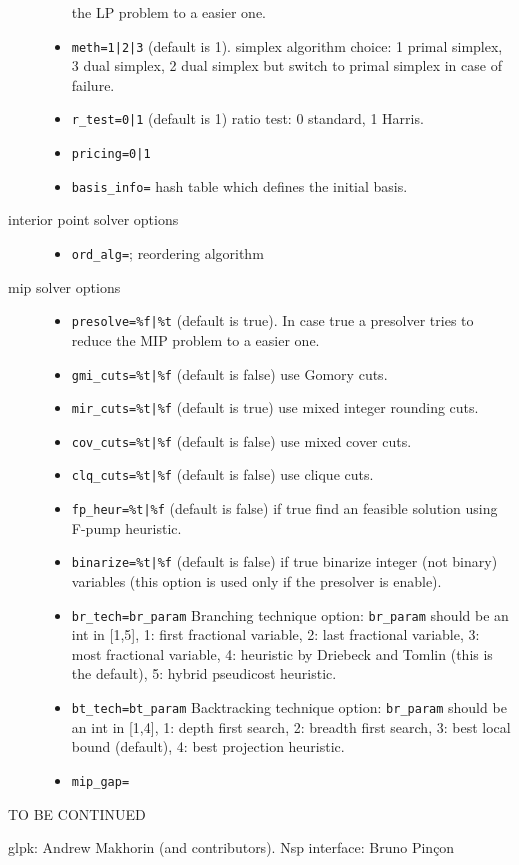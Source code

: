 \begin{mandescription}
\begin{description}
\begin{itemize}
      the LP problem to a easier one.
\item \verb+meth=1|2|3+ (default is 1). simplex algorithm choice: 1 primal simplex, 3 dual simplex, 2 
      dual simplex but switch to primal simplex in case of failure.
\item \verb+r_test=0|1+ (default is 1) ratio test: 0 standard, 1 Harris.
\item \verb+pricing=0|1+
\item \verb+basis_info=+  hash table which defines the initial basis.
\end{itemize}
\item[interior point solver options]
\begin{itemize}
\item \verb+ord_alg=+; reordering algorithm
\end{itemize}
\item[mip solver options]
\begin{itemize}
\item \verb+presolve=%f|%t+ (default is true). In case true a presolver tries to reduce
      the MIP problem to a easier one.
\item \verb+gmi_cuts=%t|%f+ (default is false) use Gomory cuts.
\item \verb+mir_cuts=%t|%f+ (default is true) use mixed integer rounding cuts.
\item \verb+cov_cuts=%t|%f+ (default is false) use mixed cover cuts.
\item \verb+clq_cuts=%t|%f+ (default is false) use clique cuts.
\item \verb+fp_heur=%t|%f+ (default is false) if true find an feasible solution using F-pump heuristic.
\item \verb+binarize=%t|%f+ (default is false) if true binarize integer (not binary) variables (this 
      option is used only if the presolver is enable).
\item \verb+br_tech=br_param+ Branching technique option: \verb+br_param+ should be an int in [1,5],
      1: first fractional variable, 2: last fractional variable, 3: most fractional variable, 4:
      heuristic by Driebeck and Tomlin (this is the default), 5: hybrid pseudicost heuristic.
\item \verb+bt_tech=bt_param+ Backtracking technique option:  \verb+br_param+ should be an int in [1,4],
      1: depth first search, 2: breadth first search, 3: best local bound (default), 4: best projection heuristic.
\item \verb+mip_gap=+
\end{itemize}
\end{description}

TO BE CONTINUED

\end{mandescription} 

\begin{examples}
  
\end{examples}

\begin{manseealso}

\end{manseealso}

\begin{authors}
 glpk: Andrew Makhorin (and contributors). Nsp interface: Bruno Pin\c{c}on
\end{authors}
